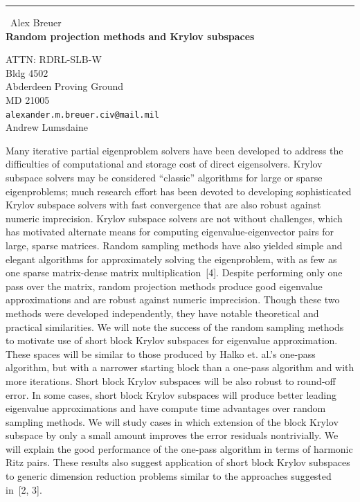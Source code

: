 \documentclass{report}
\begin{document}
\begin{center}
\rule{6in}{1pt} \
{\large Alex Breuer \\
{\bf Random projection methods and Krylov subspaces}}

ATTN: RDRL-SLB-W \\ Bldg 4502 \\ Abderdeen Proving Ground \\ MD 21005
\\
{\tt alexander.m.breuer.civ@mail.mil}\\
Andrew Lumsdaine\end{center}



\newcommand{\KS}[3]{\mathcal K_{#1}(#2,#3)}

Many iterative partial eigenproblem solvers have been developed to
address the difficulties of computational and storage cost of direct
eigensolvers. Krylov subspace solvers may be considered ``classic''
algorithms for large or sparse eigenproblems; much research effort has
been devoted to developing sophisticated Krylov subspace solvers with
fast convergence that are also robust against numeric imprecision.
Krylov subspace solvers are not without challenges, which has
motivated alternate means for computing eigenvalue-eigenvector pairs
for large, sparse matrices. Random sampling methods have also yielded
simple and elegant algorithms for approximately solving the
eigenproblem, with as few as one sparse matrix-dense matrix
multiplication~[4]. Despite performing only one pass over the matrix,
random projection methods produce good eigenvalue approximations and
are robust against numeric imprecision. Though these two methods were
developed independently, they have notable theoretical and practical
similarities. We will note the success of the random
sampling methods to motivate use of short block Krylov subspaces for
eigenvalue approximation. These spaces will be similar to those
produced by Halko et. al.'s one-pass algorithm, but with a narrower
starting block than a one-pass algorithm and with more iterations.
Short block Krylov subspaces will be also robust to round-off error.
In some cases, short block Krylov subspaces will produce better
leading eigenvalue approximations and have compute time advantages
over random sampling methods. We will study cases in which extension
of the block Krylov subspace by only a small amount improves the error
residuals nontrivially. We will explain the good performance of the
one-pass algorithm in terms of harmonic Ritz pairs. These results
also suggest application of short block Krylov subspaces to generic
dimension reduction problems similar to the approaches suggested
in~[2, 3]. \\
\end{document}
